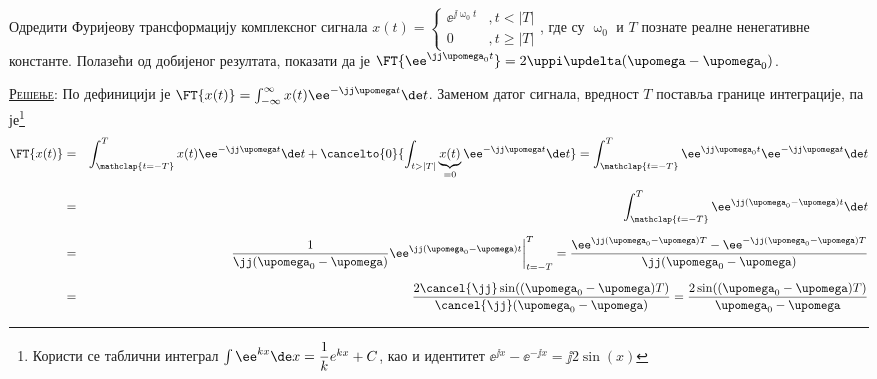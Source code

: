 \PID\mnImportant\label{z:jexp}
Одредити Фуријеову трансформацију комплексног сигнала 
$x(t) = \begin{cases}
    \ee^{\jj\upomega_0 t} &, t < |T| \\
    0 &, t \geq |T|
\end{cases}$, где су $\upomega_0$ и $T$ познате реалне ненегативне константе. 
Полазећи од добијеног резултата, показати да је 
$\FT{\ee^{\jj\upomega_0 t}} = 2 \uppi \updelta(\upomega - \upomega_0)$.

\textsc{\underline{Решење}:} По дефиницији је 
$\FT{x(t)} = \int_{-\infty}^{\infty} x(t) \ee^{-\jj\upomega t} \de t$. Заменом датог сигнала, вредност 
$T$ поставља границе интеграције, па је\footnote{Користи се таблични 
интеграл 
$\int \ee^{kx} \de x = \dfrac{1}{k} e^{kx} + C$, као и идентитет 
${\ee^{\jj x} - \ee^{-\jj x}} = \jj 2 \sin(x) $
}
\begin{eqnarray}
    \FT{x(t)}   &=& \int_{ \mathclap{t = -T} }^{T} x(t) \ee^{-\jj\upomega t} \de t +  \cancelto{0}{\int_{ t > |T| } \underbrace{x(t)}_{=0} \ee^{-\jj\upomega t} \de t} 
                =   \int_{ \mathclap{t = -T} }^{T} \ee^{\jj\upomega_0 t} \ee^{-\jj\upomega t} \de t     
                \\[2mm]
                &=&   \int_{ \mathclap{t = -T} }^{T} \ee^{\jj (\upomega_0 - \upomega) t} \de t   
                \\[2mm]
                &=& \dfrac{1}{\jj(\upomega_0 - \upomega)} \ee^{\jj (\upomega_0 - \upomega) t} \bigg|_{t = -T}^T  
                =   \dfrac{ \ee^{\jj (\upomega_0 - \upomega) T} - \ee^{-\jj (\upomega_0 - \upomega) T} }{\jj(\upomega_0 - \upomega)}  \\[2mm]
                &=&   \dfrac{2 \cancel{\jj} \sin((\upomega_0 - \upomega) T)}{ \cancel{\jj} (\upomega_0 - \upomega) } 
                =  \dfrac{2 \sin((\upomega_0 - \upomega) T)}{ \upomega_0 - \upomega } 
\end{eqnarray}

